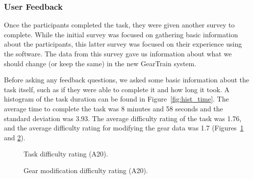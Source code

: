 \begin{doublespace}
\subsubsection{User Feedback}

Once the participants completed the task, they were given another survey to complete. While the initial survey was focused on gathering basic information about the participants, this latter survey was focused on their experience using the software. The data from this survey gave us information about what we should change (or keep the same) in the new GearTrain system.

Before asking any feedback questions, we asked some basic information about the task itself, such as if they were able to complete it and how long it took. A histogram of the task duration can be found in Figure~\ref{fig:hist_time}. The average time to complete the task was 8 minutes and 58 seconds and the standard deviation was 3.93. The average difficulty rating of the task was 1.76, and the average difficulty rating for modifying the gear data was 1.7 (Figures~\ref{fig:a20_difficulty} and \ref{fig:a20_difficulty_mod}).

\begin{figure}[htbp]
    \centering
    \caption{Task difficulty rating (A20).}
    \label{fig:a20_difficulty}
\end{figure}

\begin{figure}[htbp]
    \centering
    \caption{Gear modification difficulty rating (A20).}
    \label{fig:a20_difficulty_mod}
\end{figure}


\end{doublespace}
